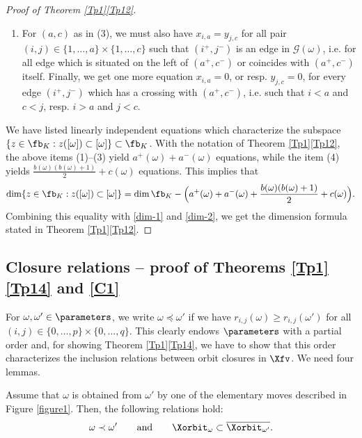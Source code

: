 \begin{proof}[Proof of Theorem \ref{Tp1}\ref{Tp12}]
\begin{enumerate}
and we must have $y_{j,c}=0$ for all $j<c$ such that $j^-$ is a free vertex in $\mathcal{G}(\omega)$.
\item For $(a,c)$ as in (3), we must also have $x_{i,a}=y_{j,c}$ for all pair $(i,j)\in\{1,\ldots,a\}\times\{1,\ldots,c\}$ such that $(i^+,j^-)$ is an edge in $\mathcal{G}(\omega)$, i.e. for all edge which is situated on the left of $(a^+,c^-)$ or coincides with $(a^+,c^-)$ itself. Finally, we get one more equation $x_{i,a}=0$, or resp. $y_{j,c}=0$, for every edge $(i^+,j^-)$ which has a crossing with $(a^+,c^-)$, i.e. such that $i<a$ and $c<j$, resp. $i>a$ and $j<c$.
\end{enumerate}
We have listed linearly independent equations which characterize the subspace $\{z\in\fb_K:z([\omega])\subset[\omega]\}\subset\fb_K$. With the notation of Theorem \ref{Tp1}\ref{Tp12}, the above items (1)--(3) yield $a^+(\omega)+a^-(\omega)$ equations, while the item (4) yields $\frac{b(\omega)(b(\omega)+1)}{2}+c(\omega)$ equations.
This implies that
\[
\dim\{z\in\fb_K:z([\omega])\subset[\omega]\}=\dim\fb_K-\Big(a^+(\omega)+a^-(\omega)+\frac{b(\omega)(b(\omega)+1)}{2}+c(\omega)\Big).
\]
Combining this equality with \eqref{dim-1} and \eqref{dim-2}, we get the dimension formula stated in Theorem \ref{Tp1}\ref{Tp12}.
\end{proof}

\subsection{Closure relations -- proof of Theorems \ref{Tp1}\ref{Tp14} and \ref{C1}}

\label{section-3.3}

For $\omega,\omega'\in\parameters$, we write $\omega\preceq\omega'$ if we have $r_{i,j}(\omega)\geq r_{i,j}(\omega')$ for all
$(i,j)\in\{0,\ldots,p\}\times\{0,\ldots,q\}$.
This clearly endows $\parameters$ with a partial order and, for showing Theorem \ref{Tp1}\ref{Tp14}, we have to show that this order characterizes the inclusion relations between orbit closures in $\Xfv$.
We need four lemmas.

\begin{lemma}
\label{lemma-3.2}\label{L3.4}
Assume that $\omega$ is obtained from $\omega'$ by one of the elementary moves described in Figure \ref{figure1}. Then, the following relations hold:
\[\omega\prec \omega'\qquad\mbox{and}\qquad \Xorbit_\omega\subset\overline{\Xorbit_{\omega'}}.\]
\end{lemma}

